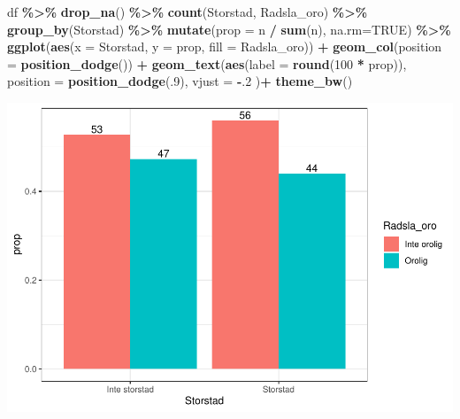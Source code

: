 \documentclass[
]{book}
\newenvironment{Shaded}{\begin{snugshade}}{\end{snugshade}}
\newcommand{\AttributeTok}[1]{\textcolor[rgb]{0.13,0.29,0.53}{#1}}
\newcommand{\ConstantTok}[1]{\textcolor[rgb]{0.56,0.35,0.01}{#1}}
\newcommand{\DecValTok}[1]{\textcolor[rgb]{0.00,0.00,0.81}{#1}}
\newcommand{\FunctionTok}[1]{\textcolor[rgb]{0.13,0.29,0.53}{\textbf{#1}}}
\newcommand{\NormalTok}[1]{#1}
\newcommand{\SpecialCharTok}[1]{\textcolor[rgb]{0.81,0.36,0.00}{\textbf{#1}}}
\begin{document}
\begin{Shaded}
\begin{Highlighting}[]
\NormalTok{df }\SpecialCharTok{\%\textgreater{}\%}
  \FunctionTok{drop\_na}\NormalTok{() }\SpecialCharTok{\%\textgreater{}\%} 
  \FunctionTok{count}\NormalTok{(Storstad, Radsla\_oro) }\SpecialCharTok{\%\textgreater{}\%} 
  \FunctionTok{group\_by}\NormalTok{(Storstad) }\SpecialCharTok{\%\textgreater{}\%}
  \FunctionTok{mutate}\NormalTok{(}\AttributeTok{prop =}\NormalTok{ n }\SpecialCharTok{/} \FunctionTok{sum}\NormalTok{(n), }\AttributeTok{na.rm=}\ConstantTok{TRUE}\NormalTok{) }\SpecialCharTok{\%\textgreater{}\%}
  \FunctionTok{ggplot}\NormalTok{(}\FunctionTok{aes}\NormalTok{(}\AttributeTok{x =}\NormalTok{ Storstad, }\AttributeTok{y =}\NormalTok{ prop, }\AttributeTok{fill =}\NormalTok{ Radsla\_oro)) }\SpecialCharTok{+}
  \FunctionTok{geom\_col}\NormalTok{(}\AttributeTok{position =} \FunctionTok{position\_dodge}\NormalTok{()) }\SpecialCharTok{+}
  \FunctionTok{geom\_text}\NormalTok{(}\FunctionTok{aes}\NormalTok{(}\AttributeTok{label =} \FunctionTok{round}\NormalTok{(}\DecValTok{100} \SpecialCharTok{*}\NormalTok{ prop)),}
            \AttributeTok{position =} \FunctionTok{position\_dodge}\NormalTok{(.}\DecValTok{9}\NormalTok{), }\AttributeTok{vjust =} \SpecialCharTok{{-}}\NormalTok{.}\DecValTok{2}
\NormalTok{  )}\SpecialCharTok{+}
  \FunctionTok{theme\_bw}\NormalTok{()}
\end{Highlighting}
\end{Shaded}

\includegraphics{_main_files/figure-latex/unnamed-chunk-19-1.pdf}

  
\end{document}

